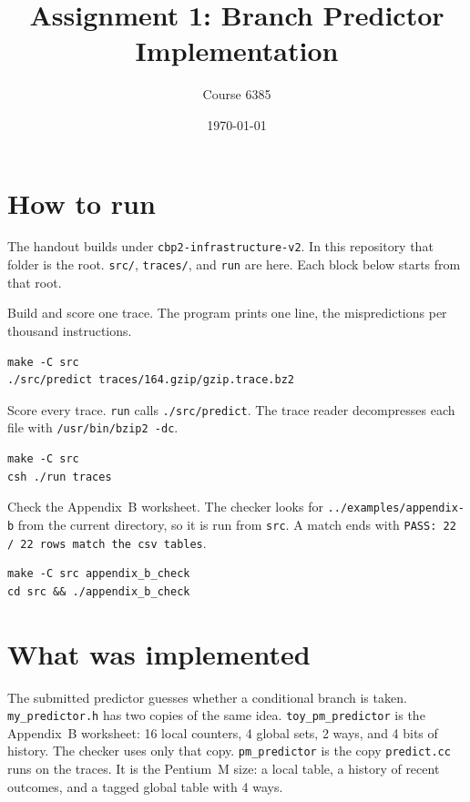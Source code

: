 \documentclass[11pt]{article}
\title{Assignment 1: Branch Predictor Implementation}
\author{Course 6385}
\date{\today}
\begin{document}
\maketitle

\section{How to run}

The handout builds under \texttt{cbp2-infrastructure-v2}.
In this repository that folder is the root.
\texttt{src/}, \texttt{traces/}, and \texttt{run} are here.
Each block below starts from that root.

Build and score one trace. The program prints one line, the mispredictions
per thousand instructions.

\begin{verbatim}
make -C src
./src/predict traces/164.gzip/gzip.trace.bz2
\end{verbatim}

Score every trace. \texttt{run} calls \texttt{./src/predict}. The trace
reader decompresses each file with \texttt{/usr/bin/bzip2 -dc}.

\begin{verbatim}
make -C src
csh ./run traces
\end{verbatim}

Check the Appendix~B worksheet. The checker looks for
\texttt{../examples/appendix-b} from the current directory, so it is run
from \texttt{src}. A match ends with
\texttt{PASS: 22 / 22 rows match the csv tables}.

\begin{verbatim}
make -C src appendix_b_check
cd src && ./appendix_b_check
\end{verbatim}

\let\oldsection\section
\renewcommand{\section}{\clearpage\oldsection}

\section{What was implemented}

The submitted predictor guesses whether a conditional branch is taken.
\texttt{my\_predictor.h} has two copies of the same idea.
\texttt{toy\_pm\_predictor} is the Appendix~B worksheet: 16 local counters,
4 global sets, 2 ways, and 4 bits of history. The checker uses only that
copy. \texttt{pm\_predictor} is the copy \texttt{predict.cc} runs on
the traces. It is the Pentium~M size: a local table, a history of recent
outcomes, and a tagged global table with 4 ways.
\end{document}
